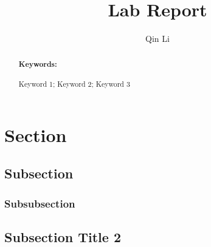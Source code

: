 \documentclass[twocolumn]{iarticle}
\title{Lab Report}
\author{Qin Li}
\begin{document}
\maketitle
\begin{abstract}
  \lipsum[1]
  \paragraph{Keywords:}
  Keyword 1; Keyword 2; Keyword 3
\end{abstract}

\section{Section}
\lipsum[1]
\subsection{Subsection}
\lipsum[2]
\subsubsection{Subsubsection}
\lipsum[3]
\subsection{Subsection Title 2}
\lipsum[4-6]
\end{document}
